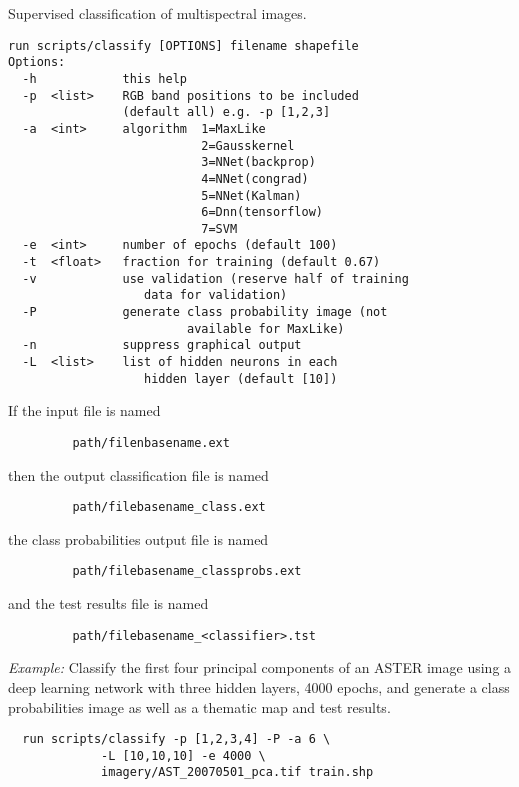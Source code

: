 \documentclass{paper}
\begin{document}
Supervised classification of multispectral images.
\begin{verbatim}
run scripts/classify [OPTIONS] filename shapefile
Options:
  -h            this help
  -p  <list>    RGB band positions to be included
                (default all) e.g. -p [1,2,3]
  -a  <int>     algorithm  1=MaxLike
                           2=Gausskernel
                           3=NNet(backprop)
                           4=NNet(congrad)
                           5=NNet(Kalman)
                           6=Dnn(tensorflow)
                           7=SVM
  -e  <int>     number of epochs (default 100)
  -t  <float>   fraction for training (default 0.67)
  -v            use validation (reserve half of training
                   data for validation)
  -P            generate class probability image (not
                         available for MaxLike)
  -n            suppress graphical output
  -L  <list>    list of hidden neurons in each
                   hidden layer (default [10])
\end{verbatim}
If the input file is named
\begin{lstlisting}
         path/filenbasename.ext
\end{lstlisting}
then the output classification file is named
\begin{lstlisting}
         path/filebasename_class.ext
\end{lstlisting}
the class probabilities output file is named
\begin{lstlisting}
         path/filebasename_classprobs.ext
\end{lstlisting}
and the test results file is named
\begin{lstlisting}
         path/filebasename_<classifier>.tst
\end{lstlisting}
{\it Example:} Classify the first four principal components of an ASTER image using a deep learning network with three hidden layers, 4000 epochs, and generate a class probabilities image as well as a thematic map and test results.
\begin{lstlisting}
  run scripts/classify -p [1,2,3,4] -P -a 6 \
             -L [10,10,10] -e 4000 \
             imagery/AST_20070501_pca.tif train.shp
\end{lstlisting}
\end{document}
